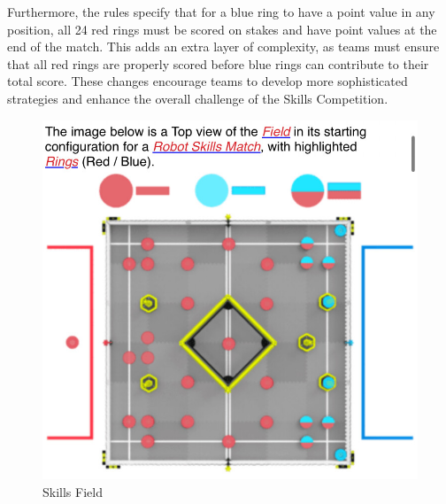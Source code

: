 Furthermore, the rules specify that for a blue ring to have a point value in any position, all 24 red rings must be scored on stakes and have point values at the end of the match. This adds an extra layer of complexity, as teams must ensure that all red rings are properly scored before blue rings can contribute to their total score. These changes encourage teams to develop more sophisticated strategies and enhance the overall challenge of the Skills Competition.

\begin{figure}[!ht]
    \centering
    \includegraphics[width=0.5\linewidth]{images/SkillsFieldHighStakes.jpeg}
    \caption{Skills Field}
    \label{fig:skillsfield}
\end{figure}
